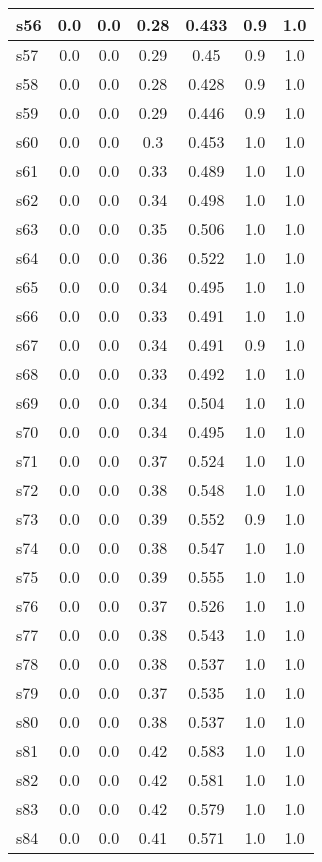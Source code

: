 \documentclass{article}
\begin{document}
\begin{tabular}{|l|c|c|c|c|c|c|}
\hline
s56 &0.0 & 0.0 & 0.28 & 0.433 & 0.9 & 1.0\\
\hline
s57 &0.0 & 0.0 & 0.29 & 0.45 & 0.9 & 1.0\\
\hline
s58 &0.0 & 0.0 & 0.28 & 0.428 & 0.9 & 1.0\\
\hline
s59 &0.0 & 0.0 & 0.29 & 0.446 & 0.9 & 1.0\\
\hline
s60 &0.0 & 0.0 & 0.3 & 0.453 & 1.0 & 1.0\\
\hline
s61 &0.0 & 0.0 & 0.33 & 0.489 & 1.0 & 1.0\\
\hline
s62 &0.0 & 0.0 & 0.34 & 0.498 & 1.0 & 1.0\\
\hline
s63 &0.0 & 0.0 & 0.35 & 0.506 & 1.0 & 1.0\\
\hline
s64 &0.0 & 0.0 & 0.36 & 0.522 & 1.0 & 1.0\\
\hline
s65 &0.0 & 0.0 & 0.34 & 0.495 & 1.0 & 1.0\\
\hline
s66 &0.0 & 0.0 & 0.33 & 0.491 & 1.0 & 1.0\\
\hline
s67 &0.0 & 0.0 & 0.34 & 0.491 & 0.9 & 1.0\\
\hline
s68 &0.0 & 0.0 & 0.33 & 0.492 & 1.0 & 1.0\\
\hline
s69 &0.0 & 0.0 & 0.34 & 0.504 & 1.0 & 1.0\\
\hline
s70 &0.0 & 0.0 & 0.34 & 0.495 & 1.0 & 1.0\\
\hline
s71 &0.0 & 0.0 & 0.37 & 0.524 & 1.0 & 1.0\\
\hline
s72 &0.0 & 0.0 & 0.38 & 0.548 & 1.0 & 1.0\\
\hline
s73 &0.0 & 0.0 & 0.39 & 0.552 & 0.9 & 1.0\\
\hline
s74 &0.0 & 0.0 & 0.38 & 0.547 & 1.0 & 1.0\\
\hline
s75 &0.0 & 0.0 & 0.39 & 0.555 & 1.0 & 1.0\\
\hline
s76 &0.0 & 0.0 & 0.37 & 0.526 & 1.0 & 1.0\\
\hline
s77 &0.0 & 0.0 & 0.38 & 0.543 & 1.0 & 1.0\\
\hline
s78 &0.0 & 0.0 & 0.38 & 0.537 & 1.0 & 1.0\\
\hline
s79 &0.0 & 0.0 & 0.37 & 0.535 & 1.0 & 1.0\\
\hline
s80 &0.0 & 0.0 & 0.38 & 0.537 & 1.0 & 1.0\\
\hline
s81 &0.0 & 0.0 & 0.42 & 0.583 & 1.0 & 1.0\\
\hline
s82 &0.0 & 0.0 & 0.42 & 0.581 & 1.0 & 1.0\\
\hline
s83 &0.0 & 0.0 & 0.42 & 0.579 & 1.0 & 1.0\\
\hline
s84 &0.0 & 0.0 & 0.41 & 0.571 & 1.0 & 1.0\\

\end{tabular}
\end{document}
